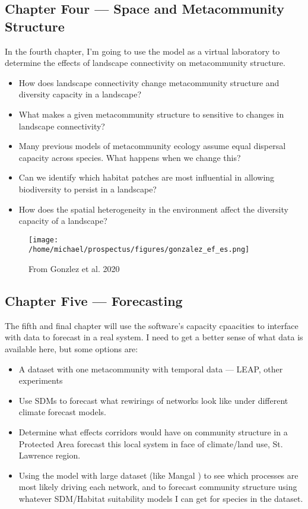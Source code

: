 \documentclass[]{article}
\begin{document}
\subsection*{Chapter Four --- Space and Metacommunity Structure}
In the fourth chapter, I'm going to use the model as a virtual laboratory to determine the effects of landscape connectivity on metacommunity structure.

\begin{itemize}
    \item How does landscape connectivity change metacommunity structure and diversity capacity in a landscape?
    \item What makes a given metacommunity structure to sensitive to changes in landscape connectivity?
    \item Many previous models of metacommunity ecology assume equal dispersal capacity across species. What happens when we change this?
    \item Can we identify which habitat patches are most influential in allowing biodiversity to persist in a landscape?
    \item How does the spatial heterogeneity in the environment affect the diversity capacity of a landscape?
\end{itemize}
\begin{figure}[H]
\centering
\texttt{[image: /home/michael/prospectus/figures/gonzalez\_ef\_es.png]}
\caption{From Gonzlez et al. 2020 \cite{gonzalez_scaling-up_2020}} \label{fig:gonzalez2020}
\end{figure}

\subsection*{Chapter Five --- Forecasting }

The fifth and final chapter will use the software's capacity cpaacities to interface with data to forecast in a real system. I need to get a better sense of what data is available here, but some options are:
\begin{itemize}
    \item A dataset with one metacommunity with temporal data --- LEAP, other experiments
    \item Use SDMs to forecast what rewirings of networks look like under different climate forecast models.
    \item Determine what effects corridors would have on community structure in a Protected Area
    forecast this local system in face of climate/land use, St. Lawrence region.
    \item Using the model with large dataset (like Mangal \cite{vissault_mangal_2019}) to see which processes are most likely driving each network, and to forecast community structure using whatever SDM/Habitat suitability models I can get for species in the dataset.
\end{itemize}
\end{document}
